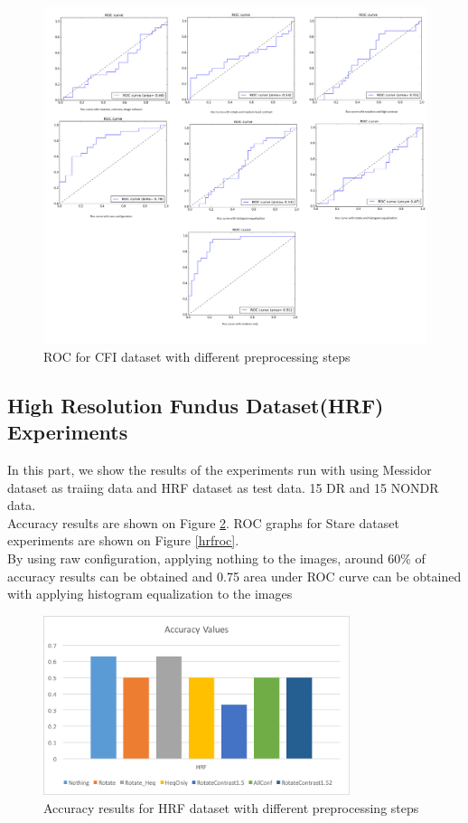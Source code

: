 \begin{figure}[!htbbp]
\centering
\includegraphics[width=1.0\textwidth]{Figures/cfi.png}
\caption{ROC for CFI dataset with different preprocessing steps}
\label{cfiroc}
\end{figure}


\subsection{High Resolution Fundus Dataset(HRF) Experiments}
In this part, we show the results of the experiments run with using Messidor dataset as traiing data and HRF dataset as test data. 15 DR and 15 NONDR data.\\
Accuracy results are shown on Figure \ref{hrfacc}. ROC graphs for Stare dataset experiments are shown on Figure \ref{hrfroc}.\\
By using raw configuration, applying nothing to the images, around 60\% of accuracy results can be obtained and 0.75 area under ROC curve can be obtained with applying histogram equalization to the images

\begin{figure}[!htbbp]
\centering
\includegraphics[width=0.8\textwidth]{Figures/hrfacc.png}
\caption{Accuracy results for HRF dataset with different preprocessing steps}
\label{hrfacc}
\end{figure}


